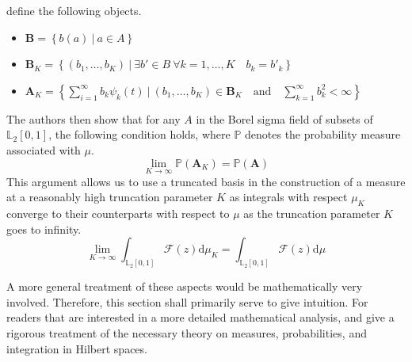 \documentclass[12pt, a4paper]{article}
\theoremstyle{MAstyle} \newtheorem{assumption}{Assumption}[section]
\theoremstyle{MAstyle} \newtheorem{definition}{Definition}[section]
\theoremstyle{MAstyle} \newtheorem{theorem}{Theorem}[section]
\begin{document}
			\cite{bugni_goodness--fit_2009} define the following objects.
			\begin{itemize}
				\item $\textbf{B} = \left\{b(a) \ \vert \ a \in A\right\}$
				\item $\textbf{B}_K = \left\{\left(b_1, \dots, b_K \right) \ \vert \ \exists b' \in B \  \forall k = 1, \dots, K \quad b_k = b'_k \right\}$
				\item $\textbf{A}_K = \left\{ \sum_{i = 1}^{\infty} b_k \psi_k(t) \ \vert \ \left(b_1, \dots, b_K \right) \in \textbf{B}_K \quad \text{and} \quad \sum_{k = 1}^{\infty} b_k^2 < \infty \right\}$
			\end{itemize}
			The authors then show that for any $A$ in the Borel sigma field of subsets of $\mathbb{L}_2[0,1]$, the following condition holds, where $\mathbb{P}$ denotes the probability measure associated with $\mu$.
			\begin{equation}
				\lim_{K \rightarrow \infty} \mathbb{P}(\textbf{A}_K) = \mathbb{P}(\textbf{A})
			\end{equation}
			This argument allows us to use a truncated basis in the construction of a measure at a reasonably high truncation parameter $K$ as integrals with respect $\mu_K$ converge to their counterparts with respect to $\mu$ as the truncation parameter $K$ goes to infinity.
			\begin{equation}
				\lim_{K \rightarrow \infty} \int_{\mathbb{L}_2[0,1]} \mathcal{F}(z) \mathrm{d}\mu_K = \int_{\mathbb{L}_2[0,1]} \mathcal{F}(z) \mathrm{d}\mu
			\end{equation}
			
			A more general treatment of these aspects would be mathematically very involved. Therefore, this section shall primarily serve to give intuition. For readers that are interested in a more detailed mathematical analysis, \cite{gihman_theory_2004} and \cite{skorohod_integration_1974} give a rigorous treatment of the necessary theory on measures, probabilities, and integration in Hilbert spaces. 
		
\end{document}
